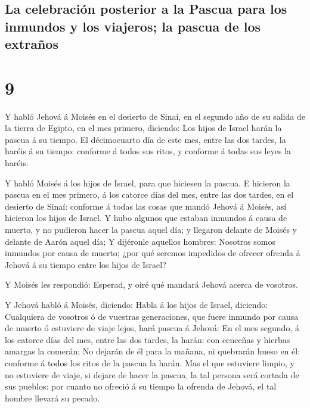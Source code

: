 \hypertarget{la-celebraciuxf3n-posterior-a-la-pascua-para-los-inmundos-y-los-viajeros-la-pascua-de-los-extrauxf1os}{%
\subsection{La celebración posterior a la Pascua para los inmundos y los
viajeros; la pascua de los
extraños}\label{la-celebraciuxf3n-posterior-a-la-pascua-para-los-inmundos-y-los-viajeros-la-pascua-de-los-extrauxf1os}}

\hypertarget{section-8}{%
\section{9}\label{section-8}}

 Y habló Jehová á Moisés en el desierto de Sinaí, en el
segundo año de su salida de la tierra de Egipto, en el mes primero,
diciendo:  Los hijos de Israel harán la pascua á su
tiempo.  El décimocuarto día de este mes, entre las dos
tardes, la haréis á su tiempo: conforme á todos sus ritos, y conforme á
todas sus leyes la haréis.

 Y habló Moisés á los hijos de Israel, para que hiciesen
la pascua.  E hicieron la pascua en el mes primero, á los
catorce días del mes, entre las dos tardes, en el desierto de Sinaí:
conforme á todas las cosas que mandó Jehová á Moisés, así hicieron los
hijos de Israel.  Y hubo algunos que estaban inmundos á
causa de muerto, y no pudieron hacer la pascua aquel día; y llegaron
delante de Moisés y delante de Aarón aquel día;  Y
dijéronle aquellos hombres: Nosotros somos inmundos por causa de muerto;
¿por qué seremos impedidos de ofrecer ofrenda á Jehová á su tiempo entre
los hijos de Israel?

 Y Moisés les respondió: Esperad, y oiré qué mandará
Jehová acerca de vosotros.

 Y Jehová habló á Moisés, diciendo:  Habla
á los hijos de Israel, diciendo: Cualquiera de vosotros ó de vuestras
generaciones, que fuere inmundo por causa de muerto ó estuviere de viaje
lejos, hará pascua á Jehová:  En el mes segundo, á los
catorce días del mes, entre las dos tardes, la harán: con cenceñas y
hierbas amargas la comerán;  No dejarán de él para la
mañana, ni quebrarán hueso en él: conforme á todos los ritos de la
pascua la harán.  Mas el que estuviere limpio, y no
estuviere de viaje, si dejare de hacer la pascua, la tal persona será
cortada de sus pueblos: por cuanto no ofreció á su tiempo la ofrenda de
Jehová, el tal hombre llevará su pecado.

